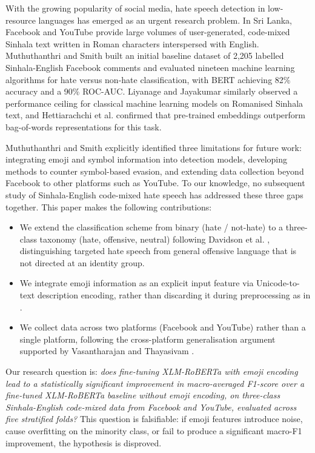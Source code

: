 \documentclass[journal]{IEEEtran}
\begin{document}
With the growing popularity of social media, hate speech detection in
low-resource languages has emerged as an urgent research problem. In Sri
Lanka, Facebook and YouTube provide large volumes of user-generated,
code-mixed Sinhala text written in Roman characters interspersed with
English. Muthuthanthri and Smith \cite{muthuthanthri2024} built an
initial baseline dataset of 2,205 labelled Sinhala-English Facebook
comments and evaluated nineteen machine learning algorithms for hate
versus non-hate classification, with BERT achieving 82\% accuracy and a
90\% ROC-AUC. Liyanage and Jayakumar \cite{liyanage2021} similarly
observed a performance ceiling for classical machine learning models on
Romanised Sinhala text, and Hettiarachchi et al. \cite{hettiarachchi2020}
confirmed that pre-trained embeddings outperform bag-of-words
representations for this task.

Muthuthanthri and Smith \cite{muthuthanthri2024} explicitly identified
three limitations for future work: integrating emoji and symbol
information into detection models, developing methods to counter
symbol-based evasion, and extending data collection beyond Facebook to
other platforms such as YouTube. To our knowledge, no subsequent study
of Sinhala-English code-mixed hate speech has addressed these three gaps
together. This paper makes the following contributions:

\begin{itemize}
\item We extend the classification scheme from binary (hate / not-hate)
to a three-class taxonomy (hate, offensive, neutral) following Davidson
et al. \cite{davidson2017}, distinguishing targeted hate speech from
general offensive language that is not directed at an identity group.
\item We integrate emoji information as an explicit input feature via
Unicode-to-text description encoding, rather than discarding it during
preprocessing as in \cite{muthuthanthri2024}.
\item We collect data across two platforms (Facebook and YouTube)
rather than a single platform, following the cross-platform
generalisation argument supported by Vasantharajan and Thayasivam
\cite{vasantharajan2022}.
\end{itemize}

Our research question is: \textit{does fine-tuning XLM-RoBERTa with
emoji encoding lead to a statistically significant improvement in
macro-averaged F1-score over a fine-tuned XLM-RoBERTa baseline without
emoji encoding, on three-class Sinhala-English code-mixed data from
Facebook and YouTube, evaluated across five stratified folds?} This
question is falsifiable: if emoji features introduce noise, cause
overfitting on the minority class, or fail to produce a significant
macro-F1 improvement, the hypothesis is disproved.
\end{document}
